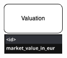 \documentclass{Configuration_Files/PoliMi3i_thesis}
\begin{document}
\begin{figure}[htbp]
\begin{subfigure}[b]{0.24\linewidth}
    \includegraphics[width=\linewidth]{Project Template/Images/entities/val.drawio.png}
  \end{subfigure}
  \hfill
  \begin{subfigure}[b]{0.12\linewidth}

\end{subfigure}
\end{figure}
\end{document}
